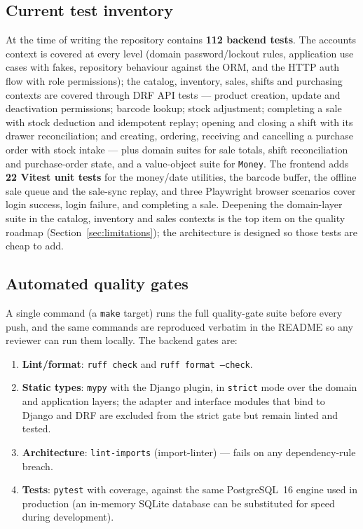 \documentclass[11pt,a4paper]{article}
\begin{document}
\subsection{Current test inventory}

At the time of writing the repository contains \textbf{112 backend tests}. The accounts context is
covered at every level (domain password/lockout rules, application use cases with fakes, repository
behaviour against the ORM, and the HTTP auth flow with role permissions); the catalog, inventory,
sales, shifts and purchasing contexts are covered through DRF API tests --- product creation,
update and deactivation permissions; barcode lookup; stock adjustment; completing a sale with stock
deduction and idempotent replay; opening and closing a shift with its drawer reconciliation; and
creating, ordering, receiving and cancelling a purchase order with stock intake --- plus domain
suites for sale totals, shift reconciliation and purchase-order state, and a value-object suite for
\texttt{Money}. The frontend adds \textbf{22 Vitest unit tests} for the money/date utilities, the
barcode buffer, the offline sale queue and the sale-sync replay, and three Playwright browser
scenarios cover login success, login failure, and completing a sale. Deepening the domain-layer
suite in the catalog, inventory and sales contexts is the top item on the quality roadmap
(Section~\ref{sec:limitations}); the architecture is designed so those tests are cheap to add.

\subsection{Automated quality gates}

A single command (a \texttt{make} target) runs the full quality-gate suite before every push, and the
same commands are reproduced verbatim in the README so any reviewer can run them locally. The
backend gates are:

\begin{enumerate}[leftmargin=1.4em]
  \item \textbf{Lint/format}: \texttt{ruff check} and \texttt{ruff format --check}.
  \item \textbf{Static types}: \texttt{mypy} with the Django plugin, in \texttt{strict} mode over the
  domain and application layers; the adapter and interface modules that bind to Django and DRF are
  excluded from the strict gate but remain linted and tested.
  \item \textbf{Architecture}: \texttt{lint-imports} (import-linter) --- fails on any dependency-rule breach.
  \item \textbf{Tests}: \texttt{pytest} with coverage, against the same PostgreSQL~16 engine used in
  production (an in-memory SQLite database can be substituted for speed during development).
\end{enumerate}
\end{document}
